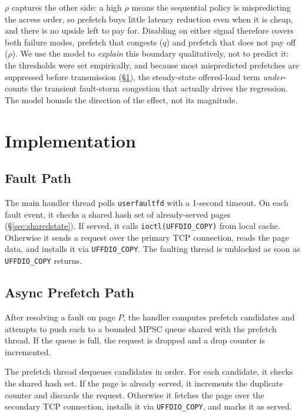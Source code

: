 \documentclass[journal]{IEEEtran}
\newcommand{\uffd}{\texttt{userfaultfd}\xspace}
\begin{document}
$\rho$ captures the other side: a high $\rho$ means the sequential policy is
mispredicting the access order, so prefetch buys little latency reduction
even when it is cheap, and there is no upside left to pay for. Disabling on
either signal therefore covers both failure modes, prefetch that congests
($q$) and prefetch that does not pay off ($\rho$). We use the model to
\emph{explain} this boundary qualitatively, not to predict it: the thresholds
were set empirically, and because most mispredicted prefetches are suppressed
before transmission (\S\ref{sec:impl}), the steady-state offered-load term
\emph{under}-counts the transient fault-storm congestion that actually drives
the regression. The model bounds the direction of the effect, not its
magnitude.

\section{Implementation}
\label{sec:impl}

\subsection{Fault Path}

The main handler thread polls \uffd with a 1-second timeout. On each fault
event, it checks a shared hash set of already-served pages
(\S\ref{sec:sharedstate}). If served, it calls \texttt{ioctl(UFFDIO\_COPY)}
from local cache. Otherwise it sends a request over the primary TCP
connection, reads the page data, and installs it via \texttt{UFFDIO\_COPY}.
The faulting thread is unblocked as soon as \texttt{UFFDIO\_COPY} returns.

\subsection{Async Prefetch Path}

After resolving a fault on page $P$, the handler computes prefetch
candidates and attempts to push each to a bounded MPSC queue shared with
the prefetch thread. If the queue is full, the request is dropped and a
drop counter is incremented.

The prefetch thread dequeues candidates in order. For each candidate, it
checks the shared hash set. If the page is already served, it increments
the duplicate counter and discards the request. Otherwise it fetches the
page over the secondary TCP connection, installs it via
\texttt{UFFDIO\_COPY}, and marks it as served.
\end{document}
